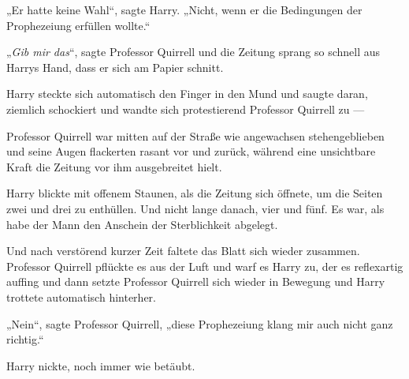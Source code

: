 „Er hatte keine Wahl“, sagte Harry.
„Nicht, wenn er die Bedingungen der Prophezeiung erfüllen wollte.“

„\emph{Gib mir das}“, sagte Professor Quirrell und die Zeitung sprang so schnell aus Harrys Hand, dass er sich am Papier schnitt.

Harry steckte sich automatisch den Finger in den Mund und saugte daran, ziemlich schockiert und wandte sich protestierend Professor Quirrell zu —

Professor Quirrell war mitten auf der Straße wie angewachsen stehengeblieben und seine Augen flackerten rasant vor und zurück, während eine unsichtbare Kraft die Zeitung vor ihm ausgebreitet hielt.

Harry blickte mit offenem Staunen, als die Zeitung sich öffnete, um die Seiten zwei und drei zu enthüllen. Und nicht lange danach, vier und fünf. Es war, als habe der Mann den Anschein der Sterblichkeit abgelegt.

Und nach verstörend kurzer Zeit faltete das Blatt sich wieder zusammen. Professor Quirrell pflückte es aus der Luft und warf es Harry zu, der es reflexartig auffing und dann setzte Professor Quirrell sich wieder in Bewegung und Harry trottete automatisch hinterher.

„Nein“, sagte Professor Quirrell, „diese Prophezeiung klang mir auch nicht ganz richtig.“

Harry nickte, noch immer wie betäubt.

